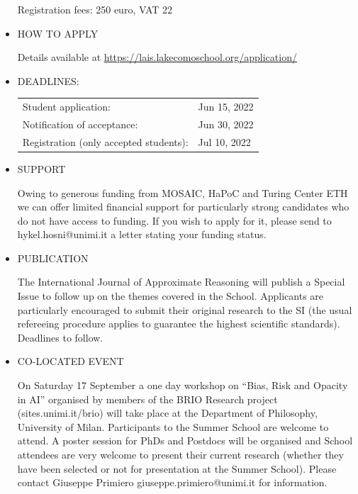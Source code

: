 \documentclass[prodmode,acmtecs]{acmsmall} %
\begin{document}
\begin{itemize}
  Registration fees: 250 euro, VAT 22%
 
\item  HOW TO APPLY 
 
  Details available at \href{https://lais.lakecomoschool.org/application/}{https://lais.lakecomoschool.org/application/} 
 
\item  DEADLINES: 
 
\begin{tabulary}{\linewidth}{LL}Student application:  & Jun 15, 2022 \\
Notification of acceptance:  & Jun 30, 2022 \\
Registration (only accepted students):  & Jul 10, 2022 \\
\end{tabulary}
 
\item  SUPPORT 
 
  Owing to generous funding from MOSAIC, HaPoC and Turing Center ETH we can offer limited financial support for particularly strong candidates who do not have access to funding. If you wish to apply for it, please send to hykel.hosni@unimi.it a letter stating your funding status. 
 
\item  PUBLICATION 
 
  The International Journal of Approximate Reasoning will publish a Special Issue to follow up on the themes covered in the School. Applicants are particularly encouraged to submit their original research to the SI (the usual refereeing procedure applies to guarantee the highest scientific standards). Deadlines to follow. 
 
\item  CO-LOCATED EVENT 
 
  On Saturday 17 September a one day workshop on “Bias, Risk and Opacity in AI” organised by members of the BRIO Research project (sites.unimi.it/brio) will take place at the Department of Philosophy, University of Milan. Participants to the Summer School are welcome to attend. A poster session for PhDs and Postdocs will be organised and School attendees are very welcome to present their current research (whether they have been selected or not for presentation at the Summer School). Please contact Giuseppe Primiero giuseppe.primiero@unimi.it for information. 
 

\end{itemize}
\end{document}
